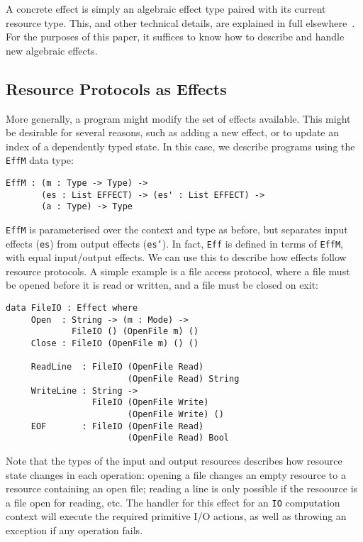 A concrete effect is simply an algebraic effect type paired with its current
resource type. This, and other
technical details, are explained in full elsewhere~\cite{brady:effects}.
For the purposes of this paper, it suffices to know how to describe and
handle new algebraic effects.

\subsection{Resource Protocols as Effects}

More generally, a program might modify the set of effects available.
This might be desirable for several reasons, such as adding a new
effect, or to update an index of a dependently typed state. In this
case, we describe programs using the \texttt{EffM} data type:

\begin{Verbatim}
EffM : (m : Type -> Type) ->
       (es : List EFFECT) -> (es' : List EFFECT) ->
       (a : Type) -> Type
\end{Verbatim}

\texttt{EffM} is parameterised over the context and type as before, but
separates input effects (\texttt{es}) from output effects (\texttt{es'}). 
In fact, \texttt{Eff}
is defined in terms of \texttt{EffM}, with equal input/output effects.
We can use this to describe how effects follow resource protocols. A simple
example is a file access protocol, where a file must be opened before it
is read or written, and a file must be closed on exit:

\begin{Verbatim}
data FileIO : Effect where
     Open  : String -> (m : Mode) -> 
             FileIO () (OpenFile m) ()
     Close : FileIO (OpenFile m) () ()

     ReadLine  : FileIO (OpenFile Read)  
                        (OpenFile Read) String
     WriteLine : String -> 
                 FileIO (OpenFile Write) 
                        (OpenFile Write) ()
     EOF       : FileIO (OpenFile Read)  
                        (OpenFile Read) Bool
\end{Verbatim}

Note that the types of the input and output resources describes how resource
state changes in each operation: opening a file changes an empty resource to
a resource containing an open file; reading a line is only possible if the
resoource is a file open for reading, etc.
The handler for this effect for an \texttt{IO} computation context will
execute the required primitive I/O actions, as well as throwing an exception
if any operation fails.

